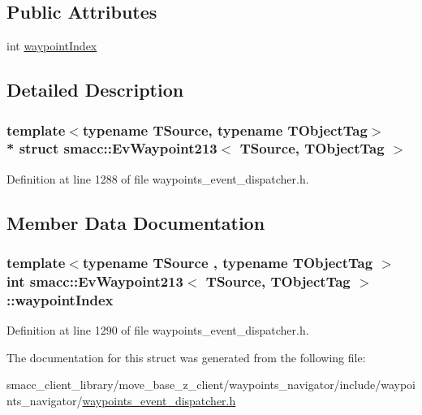 \subsection*{Public Attributes}
\begin{DoxyCompactItemize}
\item 
int \hyperlink{structsmacc_1_1EvWaypoint213_ab552e637b1a9c995b4c423832fa1a9a2}{waypoint\+Index}
\end{DoxyCompactItemize}


\subsection{Detailed Description}
\subsubsection*{template$<$typename T\+Source, typename T\+Object\+Tag$>$\\*
struct smacc\+::\+Ev\+Waypoint213$<$ T\+Source, T\+Object\+Tag $>$}



Definition at line 1288 of file waypoints\+\_\+event\+\_\+dispatcher.\+h.



\subsection{Member Data Documentation}
\subsubsection[{\texorpdfstring{waypoint\+Index}{waypointIndex}}]{\setlength{\rightskip}{0pt plus 5cm}template$<$typename T\+Source , typename T\+Object\+Tag $>$ int {\bf smacc\+::\+Ev\+Waypoint213}$<$ T\+Source, T\+Object\+Tag $>$\+::waypoint\+Index}\hypertarget{structsmacc_1_1EvWaypoint213_ab552e637b1a9c995b4c423832fa1a9a2}{}\label{structsmacc_1_1EvWaypoint213_ab552e637b1a9c995b4c423832fa1a9a2}


Definition at line 1290 of file waypoints\+\_\+event\+\_\+dispatcher.\+h.



The documentation for this struct was generated from the following file\+:\begin{DoxyCompactItemize}
\item 
smacc\+\_\+client\+\_\+library/move\+\_\+base\+\_\+z\+\_\+client/waypoints\+\_\+navigator/include/waypoints\+\_\+navigator/\hyperlink{waypoints__event__dispatcher_8h}{waypoints\+\_\+event\+\_\+dispatcher.\+h}\end{DoxyCompactItemize}
